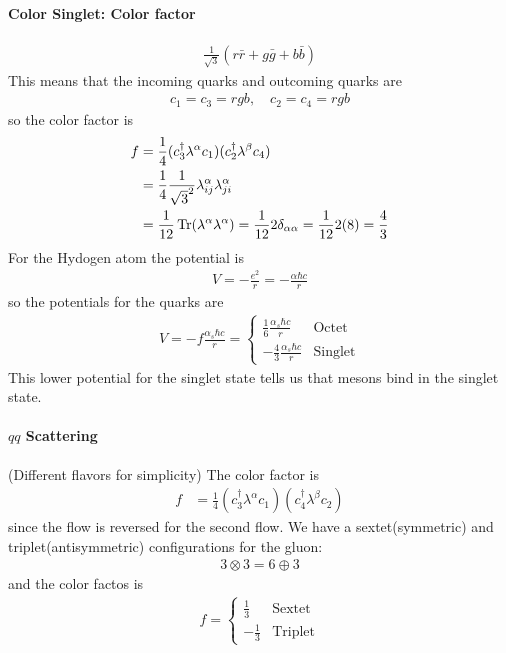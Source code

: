 \documentclass[../main.tex]{subfiles}
\begin{document}
\paragraph*{Color Singlet: Color factor} 
\begin{align*}
    \frac{1}{\sqrt{3}} (r \bar r + g \bar g + b \bar b)
\end{align*}
This means that the incoming quarks and outcoming quarks are
\begin{align*}
    c_1 = c_3 = r g b, \quad c_2 = c_4 = r g b
\end{align*}
so the color factor is
\begin{align*}
    f &= \frac{1}{4} (c_3^\dagger \lambda^\alpha c_1)(c_2^\dagger \lambda^\beta c_4) \\
    &= \frac{1}{4} \frac{1}{\sqrt{3}^2} \lambda_{ij}^\alpha \lambda_{ji}^\alpha \\
    &= \frac{1}{12} \Tr(\lambda^\alpha \lambda^\alpha) = \frac{1}{12} 2 \delta_{\alpha\alpha} 
    = \frac{1}{12} 2 (8) = \frac{4}{3}
\end{align*}
For the Hydogen atom the potential is
\begin{align*}
    V = -\frac{e^2}{r} = - \frac{\alpha \hbar c}{r}
\end{align*}
so the potentials for the quarks are
\begin{align*}
    V = -f \frac{\alpha_s \hbar c}{r}
    = \begin{cases}
        \frac{1}{6} \frac{\alpha_s \hbar c}{r} & \text{Octet} \\
        -\frac{4}{3} \frac{\alpha_s \hbar c}{r} & \text{Singlet}
    \end{cases}
\end{align*}
This lower potential for the singlet state tells us that mesons bind in the singlet state.

\paragraph*{$qq$ Scattering}
(Different flavors for simplicity)
The color factor is
\begin{align*}
    f &= \frac{1}{4} (c_3^\dagger \lambda^\alpha c_1)(c_4^\dagger \lambda^\beta c_2)
\end{align*}
since the flow is reversed for the second flow. We have a sextet(symmetric) and triplet(antisymmetric)
configurations for the gluon:
\begin{align*}
    3 \otimes 3 = 6 \oplus 3
\end{align*}
and the color factos is
\begin{align*}
    f = \begin{cases}
        \frac{1}{3} & \text{Sextet} \\
        -\frac{1}{3} & \text{Triplet}
    \end{cases}
\end{align*}
\end{document}
